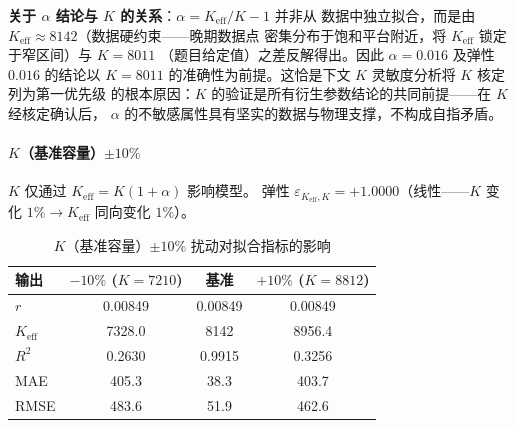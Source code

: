 \documentclass[12pt,a4paper]{ctexart}
\begin{document}
\textbf{关于 $\alpha$ 结论与 $K$ 的关系}：$\alpha = K_{\text{eff}}/K - 1$ 并非从
数据中独立拟合，而是由 $K_{\text{eff}} \approx 8142$（数据硬约束——晚期数据点
密集分布于饱和平台附近，将 $K_{\text{eff}}$ 锁定于窄区间）与 $K = 8011$
（题目给定值）之差反解得出。因此 $\alpha = 0.016$ 及弹性 $0.016$ 的结论以
$K = 8011$ 的准确性为前提。这恰是下文 $K$ 灵敏度分析将 $K$ 核定列为第一优先级
的根本原因：$K$ 的验证是所有衍生参数结论的共同前提——在 $K$ 经核定确认后，
$\alpha$ 的不敏感属性具有坚实的数据与物理支撑，不构成自指矛盾。

\paragraph{$K$（基准容量）$\pm 10\%$}

$K$ 仅通过 $K_{\text{eff}} = K(1+\alpha)$ 影响模型。
弹性 $\varepsilon_{K_{\text{eff}},K} = +1.0000$（线性——$K$ 变化 $1\% \to K_{\text{eff}}$ 同向变化 $1\%$）。

\begin{table}[htbp]
\centering
\caption{$K$（基准容量）$\pm 10\%$ 扰动对拟合指标的影响}
\label{tab:sens_K}
\begin{tabular}{lccc}
\toprule
输出 & $-10\%$ ($K = 7210$) & 基准 & $+10\%$ ($K = 8812$) \\
\midrule
$r$      & 0.00849 & 0.00849 & 0.00849 \\
$K_{\text{eff}}$ & 7328.0 & 8142 & 8956.4 \\
$R^2$    & 0.2630 & 0.9915 & 0.3256 \\
MAE      & 405.3 & 38.3 & 403.7 \\
RMSE     & 483.6 & 51.9 & 462.6 \\
\bottomrule
\end{tabular}
\end{table}
\end{document}
